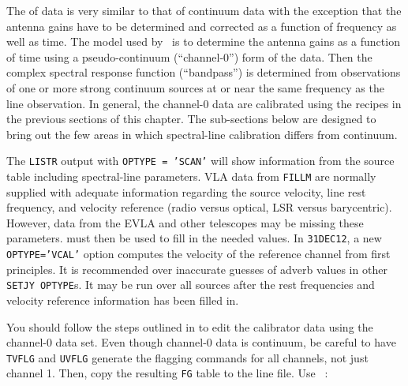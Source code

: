 
     The  of  data is very
similar to that of continuum data with the exception that the antenna
gains have to be determined and corrected as a function of frequency
as well as time. The model used by \AIPS\ is to determine the antenna
gains as a function of time using a pseudo-continuum (``channel-0'')
form of the data.  Then the complex spectral response function
(``bandpass'') is determined from observations of one or more strong
continuum sources at or near the same frequency as the line
observation.  In general, the channel-0 data are calibrated using the
recipes in the previous sections of this chapter.  The sub-sections
below are designed to bring out the few areas in which spectral-line
calibration differs from continuum.


     The {\tt LISTR} output with {\tt OPTYPE = 'SCAN'} will show
information from the source table including spectral-line parameters.
VLA data from {\tt FILLM} are normally supplied with adequate
information regarding the source velocity, line rest frequency, and
velocity reference (radio versus optical, LSR versus barycentric).
However, data from the EVLA and other telescopes may be missing these
parameters.  {\tt {}} must then be used to fill in the
needed values.  In {\tt 31DEC12}, a new {\tt OPTYPE='VCAL'} option
computes the velocity of the reference channel from first principles.
It is recommended over inaccurate guesses of adverb values in other
{\tt SETJY OPTYPE}s.  It may be run over all sources after the rest
frequencies and velocity reference information has been filled in.


     You should follow the steps outlined in  to edit the
calibrator data using the channel-0 data set.  Even though channel-0
data is continuum, be careful to have {\tt TVFLG} and {\tt UVFLG}
generate the flagging commands for all channels, not just channel 1.
Then, copy the resulting {\tt FG} table to the line file. Use {\tt
{}}:

